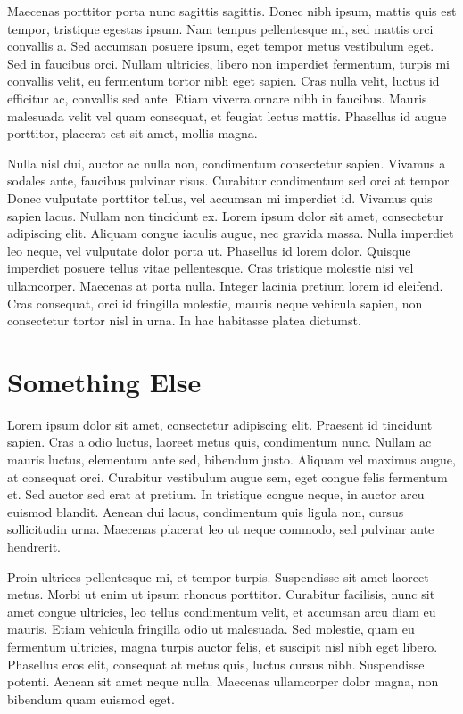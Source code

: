 Maecenas porttitor porta nunc sagittis sagittis. Donec nibh ipsum, mattis quis est tempor, tristique egestas ipsum. Nam tempus pellentesque mi, sed mattis orci convallis a. Sed accumsan posuere ipsum, eget tempor metus vestibulum eget. Sed in faucibus orci. Nullam ultricies, libero non imperdiet fermentum, turpis mi convallis velit, eu fermentum tortor nibh eget sapien. Cras nulla velit, luctus id efficitur ac, convallis sed ante. Etiam viverra ornare nibh in faucibus. Mauris malesuada velit vel quam consequat, et feugiat lectus mattis. Phasellus id augue porttitor, placerat est sit amet, mollis magna.

Nulla nisl dui, auctor ac nulla non, condimentum consectetur sapien. Vivamus a sodales ante, faucibus pulvinar risus. Curabitur condimentum sed orci at tempor. Donec vulputate porttitor tellus, vel accumsan mi imperdiet id. Vivamus quis sapien lacus. Nullam non tincidunt ex. Lorem ipsum dolor sit amet, consectetur adipiscing elit. Aliquam congue iaculis augue, nec gravida massa. Nulla imperdiet leo neque, vel vulputate dolor porta ut. Phasellus id lorem dolor. Quisque imperdiet posuere tellus vitae pellentesque. Cras tristique molestie nisi vel ullamcorper. Maecenas at porta nulla. Integer lacinia pretium lorem id eleifend. Cras consequat, orci id fringilla molestie, mauris neque vehicula sapien, non consectetur tortor nisl in urna. In hac habitasse platea dictumst.

\section{Something Else}

Lorem ipsum dolor sit amet, consectetur adipiscing elit. Praesent id tincidunt sapien. Cras a odio luctus, laoreet metus quis, condimentum nunc. Nullam ac mauris luctus, elementum ante sed, bibendum justo. Aliquam vel maximus augue, at consequat orci. Curabitur vestibulum augue sem, eget congue felis fermentum et. Sed auctor sed erat at pretium. In tristique congue neque, in auctor arcu euismod blandit. Aenean dui lacus, condimentum quis ligula non, cursus sollicitudin urna. Maecenas placerat leo ut neque commodo, sed pulvinar ante hendrerit.

Proin ultrices pellentesque mi, et tempor turpis. Suspendisse sit amet laoreet metus. Morbi ut enim ut ipsum rhoncus porttitor. Curabitur facilisis, nunc sit amet congue ultricies, leo tellus condimentum velit, et accumsan arcu diam eu mauris. Etiam vehicula fringilla odio ut malesuada. Sed molestie, quam eu fermentum ultricies, magna turpis auctor felis, et suscipit nisl nibh eget libero. Phasellus eros elit, consequat at metus quis, luctus cursus nibh. Suspendisse potenti. Aenean sit amet neque nulla. Maecenas ullamcorper dolor magna, non bibendum quam euismod eget.

